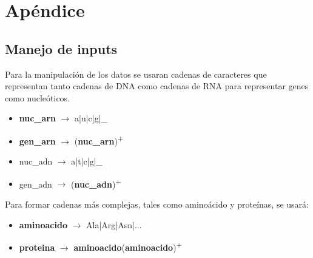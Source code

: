 \documentclass[10pt,a4paper,english,spanish]{article}
\begin{document}
\section{Apéndice}
\subsection{Manejo de inputs}
\par Para la manipulación de los datos se usaran cadenas de caracteres que representan tanto cadenas de DNA como cadenas de RNA para representar genes como nucleóticos.
\begin{itemize}
	\item \textbf{nuc\_arn} $\to$  a|u|c|g|\_ 
	\item \textbf{gen\_arn} $\to$ (\textbf{nuc\_arn})\textsuperscript{+}

	\item {nuc\_adn} $\to$ a|t|c|g|\_
	\item {gen\_adn} $\to$ (\textbf{nuc\_adn})\textsuperscript{+}
\end{itemize}
\par Para formar cadenas más complejas, tales como aminoácido y proteínas, se usará:
\begin{itemize}
 	\item \textbf{aminoacido} $\to$ Ala|Arg|Asn|...	
	\item \textbf{proteina} $\to$ \textbf{aminoacido}(\textbf{aminoacido})\textsuperscript{+}
\end{itemize}
\end{document}
